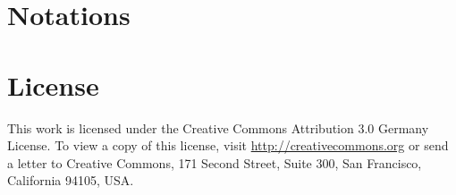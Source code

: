 \documentclass[ITR,MA,english,final]{LSR_thesis}
\begin{document}
\phantom{u}
\phantom{1}\vspace{6cm}
\begin{center}
\end{center}


\pagestyle{fancy}

\tableofcontents 









\appendix
	
\cleardoublepage
{} 
\listoffigures 	

\cleardoublepage
\chapter*{Notations}


\cleardoublepage
{}



\cleardoublepage
\chapter*{License}
This work is licensed under the Creative Commons Attribution 3.0 Germany
License. To view a copy of this license,
visit \href{http://creativecommons.org/licenses/by/3.0/de/}{http://creativecommons.org} or send a letter
to Creative Commons, 171 Second Street, Suite 300, San
Francisco, California 94105, USA.

\end{document}

